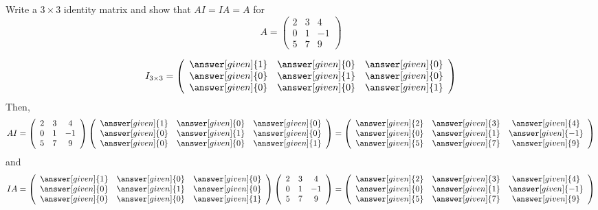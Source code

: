 \documentclass{ximera}
\begin{document}
\begin{question}
Write a $3 \times 3$ identity matrix and show that $AI = IA = A$ for
\[A =  \left(\begin{array}{ccc}
2 & 3 & 4\\
0  & 1 & -1\\
5 & 7 & 9
\end{array}\right)
\]

\begin{prompt}
\[
I_{3\times 3} = \left(\begin{array}{ccc}
\answer[given]{1} & \answer[given]{0} & \answer[given]{0}\\
\answer[given]{0} & \answer[given]{1} & \answer[given]{0}\\
\answer[given]{0} & \answer[given]{0} & \answer[given]{1}
\end{array}\right)
\]
Then,
\[
AI = \left(\begin{array}{ccc}
2 & 3 & 4\\
0  & 1 & -1\\
5 & 7 & 9
\end{array}\right)\left(\begin{array}{ccc}
\answer[given]{1} & \answer[given]{0} & \answer[given]{0}\\
\answer[given]{0} & \answer[given]{1} & \answer[given]{0}\\
\answer[given]{0} & \answer[given]{0} & \answer[given]{1}
\end{array}\right)= \left(\begin{array}{ccc}
\answer[given]{2} & \answer[given]{3} & \answer[given]{4}\\
\answer[given]{0} & \answer[given]{1} & \answer[given]{-1}\\
\answer[given]{5} & \answer[given]{7} & \answer[given]{9}
\end{array}\right)\]
and
\[
IA = \left(\begin{array}{ccc}
\answer[given]{1} & \answer[given]{0} & \answer[given]{0}\\
\answer[given]{0} & \answer[given]{1} & \answer[given]{0}\\
\answer[given]{0} & \answer[given]{0} & \answer[given]{1}
\end{array}\right)\left(\begin{array}{ccc}
2 & 3 & 4\\
0  & 1 & -1\\
5 & 7 & 9
\end{array}\right)= \left(\begin{array}{ccc}
\answer[given]{2} & \answer[given]{3} & \answer[given]{4}\\
\answer[given]{0} & \answer[given]{1} & \answer[given]{-1}\\
\answer[given]{5} & \answer[given]{7} & \answer[given]{9}
\end{array}\right)\]
\end{prompt}
\end{question}
\end{document}
